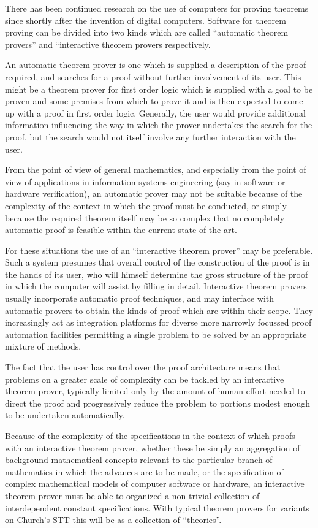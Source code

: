 There has been continued research on the use of computers for proving
theorems since shortly after the invention of digital computers.
Software for theorem proving can be divided into two kinds which are
called ``automatic theorem provers'' and ``interactive theorem provers
respectively.

An automatic theorem prover is one which is supplied a description of
the proof required, and searches for a proof without further
involvement of its user.
This might be a theorem prover for first order logic which is supplied
with a goal to be proven and some premises from which to prove it and
is then expected to come up with a proof in first order logic.
Generally, the user would provide additional information influencing
the way in which the prover undertakes the search for the proof, but
the search would not itself involve any further interaction with the
user.

From the point of view of general mathematics, and especially from
the point of view of applications in information systems engineering
(say in software or hardware verification), an automatic prover may
not be suitable because of the complexity of the context in which the
proof must be conducted, or simply because the required theorem itself
may be so complex that no completely automatic proof is feasible
within the current state of the art.

For these situations the use of an ``interactive theorem prover'' may
be preferable.
Such a system presumes that overall control of the construction of the
proof is in the hands of its user, who will himself determine the
gross structure of the proof in which the computer will assist by
filling in detail.
Interactive theorem provers usually incorporate automatic proof
techniques, and may interface with automatic provers to obtain the
kinds of proof which are within their scope.
They increasingly act as integration platforms for diverse more
narrowly focussed proof automation facilities permitting a single
problem to be solved by an appropriate mixture of methods.

The fact that the user has control over the proof architecture means
that problems on a greater scale of complexity can be tackled by an
interactive theorem prover, typically limited only by the amount of
human effort needed to direct the proof and progressively reduce the
problem to portions modest enough to be undertaken automatically.

Because of the complexity of the specifications in the context of
which proofs with an interactive theorem prover, whether these be
simply an aggregation of background mathematical concepts relevant to
the particular branch of mathematics in which the advances are to be
made, or the specification of complex mathematical models of computer
software or hardware, an interactive theorem prover must be able to
organized a non-trivial collection of interdependent constant
specifications.
With typical theorem provers for variants on Church's STT this will be
as a collection of ``theories''.

